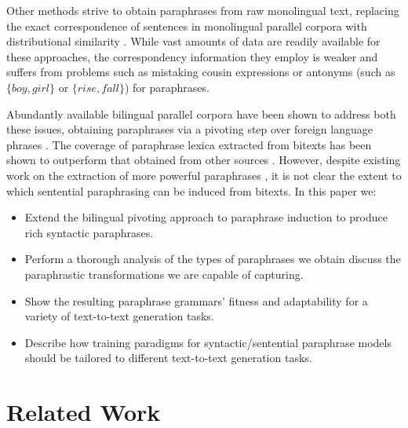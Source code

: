 \documentclass[11pt]{article}
\begin{document}
Other methods strive to obtain paraphrases from raw monolingual text,
replacing the exact correspondence of sentences in monolingual parallel corpora with
distributional similarity \cite{Lin2001,Bhagat2008}. While
vast amounts of data are readily available for these approaches, the
correspondency information they employ is weaker and suffers from
problems such as mistaking cousin expressions or antonyms (such as
$\{\mathit{boy}, \mathit{girl}\}$ or $\{\mathit{rise},
\mathit{fall}\}$) for paraphrases.

Abundantly available bilingual parallel corpora have been shown to
address both these issues, obtaining paraphrases via a pivoting step
over foreign language phrases \cite{Callison-Burch2005}. The coverage
of paraphrase lexica extracted from bitexts has been shown to
outperform that obtained from other sources \cite{Zhao2008b}. However,
despite existing work on the extraction of more powerful paraphrases
\cite{Madnani2007,Callison-Burch2008,cohn-lapata:2008,Zhao2008}, it is not clear the extent to which sentential paraphrasing can be induced from bitexts. In this paper
we:
\begin{itemize}
\item Extend the bilingual pivoting approach to paraphrase induction
  to produce rich syntactic paraphrases.
\item Perform a thorough analysis of the types of paraphrases we obtain discuss the
  paraphrastic transformations we are capable of capturing.
\item Show the resulting paraphrase grammars' fitness and adaptability
  for a variety of text-to-text generation tasks.
\item Describe how training paradigms for
  syntactic/sentential paraphrase models should be tailored to different text-to-text generation tasks. 
\end{itemize}


\section{Related Work} \label{related_work}
\end{document}
